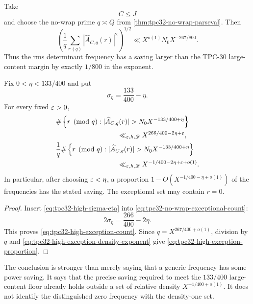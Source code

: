 Take
\begin{equation}
 C\le J
 \label{eq:tpc32-high-C-below-J}
\end{equation}
and choose the no-wrap prime $q\asymp Q$ from
\cref{thm:tpc32-no-wrap-parseval}.  Then
\begin{equation}
 \left(
 \frac1q\sum_{r\, (q)}|\widehat A_{C,q}(r)|^2
 \right)^{1/2}
 \ll X^{o(1)}N_0X^{-267/800}.
 \label{eq:tpc32-high-rms-bound}
\end{equation}
Thus the rms determinant frequency has a saving larger than the
TPC-30 large-content margin by exactly $1/800$ in the exponent.

\begin{corollary}
\label{cor:tpc32-high-almost-all-frequencies}
Fix $0<\eta<133/400$ and put
\begin{equation}
 \sigma_\eta=\frac{133}{400}-\eta.
 \label{eq:tpc32-high-sigma-eta}
\end{equation}
For every fixed $\varepsilon>0$,
\begin{align}
 &\#\left\{r\pmod q:
 |\widehat A_{C,q}(r)|>
 N_0X^{-133/400+\eta}\right\}
 \notag\\
 &\hspace{9em}
 \ll_{\eps,h,\mathscr D}
 X^{266/400-2\eta+\eps},
 \label{eq:tpc32-high-exception-count}\\
 &\frac1q
 \#\left\{r\pmod q:
 |\widehat A_{C,q}(r)|>
 N_0X^{-133/400+\eta}\right\}
 \notag\\
 &\hspace{9em}
 \ll_{\eps,h,\mathscr D}
 X^{-1/400-2\eta+\eps+o(1)}.
 \label{eq:tpc32-high-exception-proportion}
\end{align}
In particular, after choosing $\varepsilon<\eta$, a proportion
$1-O(X^{-1/400-\eta+o(1)})$ of the frequencies has the stated saving.
The exceptional set may contain $r=0$.
\end{corollary}

\begin{proof}
Insert \eqref{eq:tpc32-high-sigma-eta} into
\eqref{eq:tpc32-no-wrap-exceptional-count}:
\[
 2\sigma_\eta
 =\frac{266}{400}-2\eta.
\]
This proves \eqref{eq:tpc32-high-exception-count}.  Since
$q=X^{267/400+o(1)}$, division by $q$ and
\eqref{eq:tpc32-high-exception-density-exponent} give
\eqref{eq:tpc32-high-exception-proportion}.
\end{proof}

The conclusion is stronger than merely saying that a generic frequency
has some power saving.  It says that the precise saving required to meet
the $133/400$ large-content floor already holds outside a set of relative
density $X^{-1/400+o(1)}$.  It does not identify the distinguished zero
frequency with the density-one set.


